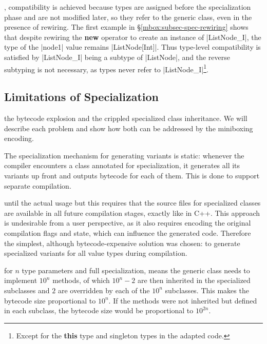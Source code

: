 , compatibility is achieved because types are assigned before the specialization phase and are not modified later, so they refer to the generic class, even in the presence of rewiring. The first example in \S\ref{mbox:subsec-spec-rewiring} shows that despite rewiring the {\bf new} operator to create an instance of |ListNode_I|, the type of the |node1| value remains |ListNode[Int]|. Thus type-level compatibility is satisfied by |ListNode_I| being a subtype of |ListNode|, and the reverse subtyping is not necessary, as types never refer to |ListNode_I|\footnote{Except for the {\bf this} type and singleton types in the adapted code.}.

\subsection{Limitations of Specialization}
\label{mbox:subsec-spec-limits}

 the bytecode explosion and the crippled specialized class inheritance. We will describe each problem and show how both can be addressed by the miniboxing encoding.

The specialization mechanism for generating variants is static: whenever the compiler encounters a class annotated for specialization, it generates all its variants up front and outputs bytecode for each of them. This is done to support separate compilation.

 until the actual usage but this requires that the source files for specialized classes are available in all future compilation stages, exactly like in C++. This approach is undesirable from a user perspective, as it also requires encoding the original compilation flags and state, which can influence the generated code. Therefore the simplest, although bytecode-expensive solution was chosen: to generate specialized variants for all value types during compilation.

 for $n$ type parameters and full specialization, means the generic class needs to implement $10^n$ methods, of which $10^n - 2$ are then inherited in the specialized subclasses and $2$ are overridden by each of the $10^n$ subclasses. This makes the bytecode size proportional to $10^n$. If the methods were not inherited but defined in each subclass, the bytecode size would be proportional to $10^{2n}$.


